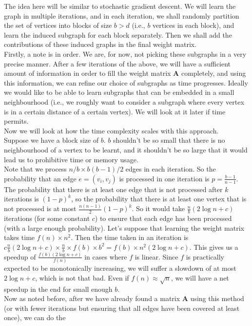 \documentclass[a4paper]{article}
\newcommand{\nl}{\vspace{0.2cm}\\}
\newcommand{\mf}{\mathbf}
\begin{document}
The idea here will be similar to stochastic gradient descent. We will learn the graph in multiple iterations, and in each iteration, we shall randomly partition the set of vertices into blocks of size
$b > d$ (i.e., $b$ vertices in each block), and learn the induced subgraph for each block separately. Then we shall add the contributions of these induced graphs in the final weight matrix.\nl
Firstly, a note is in order. We are, for now, not picking these subgraphs in a very precise manner. After a few iterations of the above, we will have a sufficient amount of information in order to
fill the weight matrix $\mf{A}$ completely, and using this information, we can refine our choice of subgraphs as time progresses. Ideally we would like to be able to learn subgraphs that can be
embedded in a small neighbourhood (i.e., we roughly want to consider a subgraph where every vertex is in a certain distance of a certain vertex). We will look at it later if time permits. \nl
Now we will look at how the time complexity scales with this approach.\nl
Suppose we have a block size of $b$. $b$ shouldn't be so small that there is no neighbourhood of a vertex to be learnt, and it shouldn't be so large that it would lead us to prohibitive time
or memory usage.\nl
Note that we process $n/b \times b(b - 1)/2$ edges in each iteration. So the probability that an edge $e = (v_i, v_j)$ is processed in one iteration is $p = \frac{b - 1}{n - 1}$. The probability
that there is at least one edge that is not processed after $k$ iterations is $(1 - p)^k$, so the probability that there is at least one vertex that is not processed is at most $\frac{n(n - 1)}{2}
(1 - p)^k$. So it would take
$\frac{n}{b} (2 \log n + c)$ iterations (for some constant $c$) to ensure that each edge has been processed (with a large enough probability). Let's suppose that learning the weight matrix takes time $f(n) \times n^2$. Then the time taken in an iteration
is $c \frac{n}{b} (2 \log n + c) \times \frac{n}{b} \times f(b) \times b^2 = f(b) \times n^2 (2 \log n + c)$. This gives us a speedup of $\frac{f(b) (2 \log n + c)}{f(n)}$ in cases where $f$ is linear. Since $f$ is
practically expected to be monotonically increasing, we will suffer a slowdown of at most $2 \log n + c$, which is not that bad. Even if $f(n) \approx \sqrt{n}$, we will have a net speedup in the
end for small enough $b$. \nl
Now as noted before, after we have already found a matrix $\mf{A}$ using this method (or with fewer iterations but ensuring that all edges have been covered at least once), we can do the
\end{document}
